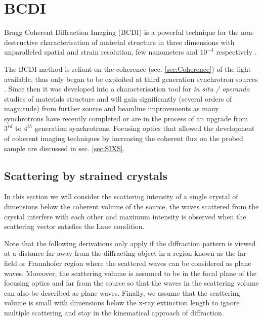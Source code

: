 \newpage
\section{BCDI} \label{sec:BCDI}

Bragg Coherent Diffraction Imaging (BCDI) \parencite{robinson_coherent_2009} is a powerful technique for the non-destructive characterisation of material structure in three dimensions with unparalleled spatial and strain resolution, few nanometers \parencite{labat_inversion_2015,cherukara_anisotropic_2018} and $10^{-4 }$ respectively \parencite{Newton2010,Lauraux2020}.

The BCDI method is reliant on the coherence (sec. \ref{sec:Coherence}) of the light available, thus only began to be exploited at third generation synchrotron sources \parencite{Miao1999,Miao2000,Robinson2001}.
Since then it was developed into a characterisation tool for \textit{in situ / operando} studies of materials structure \parencite{ulvestad_situ_2016,Kim2019,Carnis2021} and will gain significantly (several orders of magnitude) from further source and beamline improvements as many synchrotrons have recently completed or are in the process of an upgrade from $3^{rd}$ to $4^{th}$ generation synchrotrons.
Focusing optics that allowed the development of coherent imaging techniques by increasing the coherent flux on the probed sample are discussed in sec. \ref{sec:SIXS}.

\subsection{Scattering by strained crystals}

In this section we will consider the scattering intensity of a single crystal of dimensions below the coherent volume of the source, the waves scattered from the crystal interfere with each other and maximum intensity is observed when the scattering vector satisfies the Laue condition.

Note that the following derivations only apply if the diffraction pattern is viewed at a distance far away from the diffracting object in a region known as the far-field or Fraunhofer region where the scattered waves can be considered as plane waves.
Moreover, the scattering volume is assumed to be in the focal plane of the focusing optics and far from the source so that the waves in the scattering volume can also be described as plane waves.
Finally, we assume that the scattering volume is small with dimensions below the x-ray extinction length to ignore multiple scattering and stay in the kinematical approach of diffraction.

